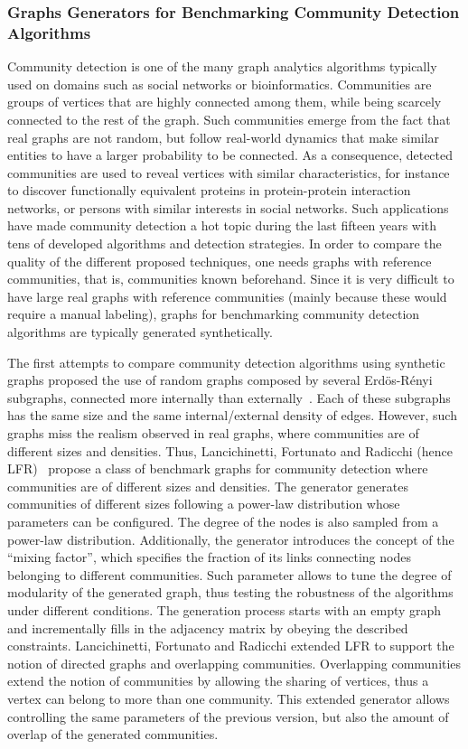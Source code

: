 \subsubsection{Graphs Generators for Benchmarking Community Detection Algorithms}
\label{sec:generators_community_detection}

Community detection is one of the many graph analytics algorithms typically used on domains such as social networks or bioinformatics. Communities are groups of vertices that are highly connected among them, while being scarcely connected to the rest of the graph. Such communities emerge from the fact that real graphs are not random, but follow real-world dynamics that make similar entities to have a larger probability to be connected. As a consequence, detected communities are used to reveal vertices with similar characteristics, for instance to discover functionally equivalent proteins in protein-protein interaction networks, or persons with similar interests in social networks. Such applications have made community detection a hot topic during the last fifteen years with tens of developed algorithms and detection strategies. In order to compare the quality of the different proposed techniques, one needs graphs with reference communities, that is, communities known beforehand. Since it is very difficult to have large real graphs with reference communities (mainly because these would require a manual labeling), graphs for benchmarking community detection algorithms are typically generated synthetically.

The first attempts to compare community detection algorithms using synthetic graphs proposed the use of random graphs composed by several Erd\"{o}s-R\'{e}nyi subgraphs, connected more internally than externally~\cite{danon2005comparing}. Each of these subgraphs has the same size and the same internal/external density of edges. However, such graphs miss the realism observed in real graphs, where communities are of different sizes and densities. Thus, Lancichinetti, Fortunato and Radicchi (hence LFR)~\cite{PhysRevE.78.046110} propose a class of benchmark graphs for community detection where communities are of different sizes and densities. The generator generates communities of different sizes following a power-law distribution whose parameters can be configured. The degree of the nodes is also sampled from a power-law distribution. Additionally, the generator introduces the concept of the ``mixing factor'', which specifies the fraction of its links connecting nodes belonging to different communities. Such parameter allows to tune the degree of modularity of the generated graph, thus testing the robustness of the algorithms under different conditions. The generation process starts with an empty graph and incrementally fills in the adjacency matrix by obeying the described constraints. Lancichinetti, Fortunato and Radicchi \cite{PhysRevE.80.016118} extended LFR to support the notion of directed graphs and overlapping communities. Overlapping communities extend the notion of communities by allowing the sharing of vertices, thus a vertex can belong to more than one community. This extended generator allows controlling the same parameters of the previous version, but also the amount of overlap of the generated communities.


